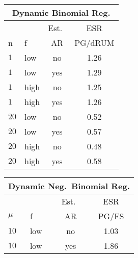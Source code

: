 \documentclass[11pt]{article}
\begin{document}
\begin{table}
\small
\centering 

\begin{tabular}{l l c c}
\multicolumn{4}{c}{Dynamic Binomial Reg.} \\
\hline
& & Est.\ & ESR \\
n & f & AR & PG/dRUM \\
\hline
$1$ & low & no & 1.26 \\
$1$ & low & yes & 1.29 \\

$1$ & high & no & 1.25 \\
$1$ & high & yes & 1.26 \\

$20$ & low & no & 0.52 \\
$20$ & low & yes & 0.57 \\

$20$ & high & no & 0.48 \\
$20$ & high & yes & 0.58 
\end{tabular}
%
\hspace{12pt}
%
\begin{tabular}{l l c c}
\multicolumn{4}{c}{Dynamic Neg.\ Binomial Reg.} \\
\hline
& & Est.\ & ESR \\
$\mu$ & f & AR & PG/FS \\
\hline
$10$ & low & no & 1.03 \\
$10$ & low & yes & 1.86 \\


\end{tabular}
\end{table}
\end{document}
